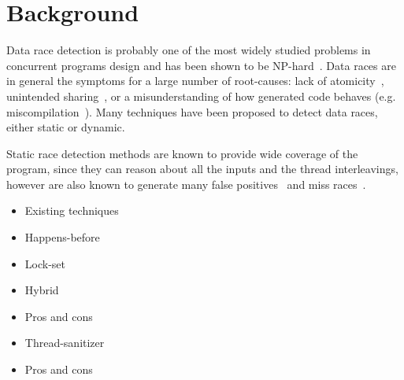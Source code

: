 \section{Background}
\label{sec:background}

Data race detection is probably one of the most widely studied problems in
concurrent programs design and has been shown to be
NP-hard~\cite{netzer-miller}.
%
Data races are in general the symptoms for a large number of root-causes: lack
of atomicity~\cite{usenix-race-erickson-et-al}, unintended
sharing~\cite{race-rv-2012-talk}, or a misunderstanding of how generated code
behaves (e.g. miscompilation~\cite{Boehm:2011:MPB:2001252.2001255}).
%
Many techniques have been proposed to detect data races, either static or
dynamic.

Static race detection methods are known to provide wide coverage of the
program, since they can reason about all the inputs and the thread
interleavings, however are also known to generate many false
positives~\cite{Pratikakis:2011:LPS:1889997.1890000} and miss
races~\cite{Voung:2007:RSR:1287624.1287654}.

\begin{itemize}
\item Existing techniques
\item Happens-before
\item Lock-set
\item Hybrid
\item Pros and cons
\item Thread-sanitizer
\item Pros and cons
\end{itemize}

